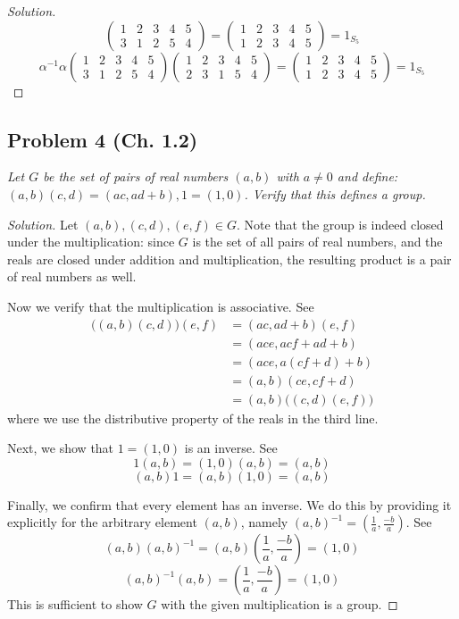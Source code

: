 \documentclass{article}
\begin{document}
\begin{proof}[Solution]
\[		\begin{pmatrix} 1 & 2 & 3 & 4 & 5 \\ 3 & 1 & 2 & 5 & 4 \end{pmatrix}
		= \begin{pmatrix} 1 & 2 & 3 & 4 & 5 \\ 1 & 2 & 3 & 4 & 5 \end{pmatrix}
		= 1_{S_5} 
	\]
	\[
		\alpha^{-1} \alpha
		\begin{pmatrix} 1 & 2 & 3 & 4 & 5 \\ 3 & 1 & 2 & 5 & 4 \end{pmatrix}
		\begin{pmatrix} 1 & 2 & 3 & 4 & 5 \\ 2 & 3 & 1 & 5 & 4 \end{pmatrix}
		= \begin{pmatrix} 1 & 2 & 3 & 4 & 5 \\ 1 & 2 & 3 & 4 & 5 \end{pmatrix}
		= 1_{S_5} 
	\]
\end{proof}

\subsection*{Problem 4 (Ch. 1.2)}
{\it Let $G$ be the set of pairs of real numbers $(a,b)$ with $a \neq 0$ and define:
$(a,b)(c,d) = (ac, ad + b), 1 = (1,0)$.
Verify that this defines a group.}

\begin{proof}[Solution]\let\qed\relax
	Let $(a,b), (c,d), (e,f) \in G$.
	Note that the group is indeed closed under the multiplication:
	since $G$ is the set of all pairs of real numbers,
	and the reals are closed under addition and multiplication,
	the resulting product is a pair of real numbers as well.

	Now we verify that the multiplication is associative.
	See
	\begin{align*}
		\big((a,b)(c,d)\big)(e,f)
		&= (ac, ad + b)(e,f)\\
		&= (ace, acf + ad + b)\\
		&= (ace, a(cf + d) + b)\\
		&= (a,b)(ce, cf + d)\\
		&= (a,b)\big((c,d)(e,f)\big)
	\end{align*}
	where we use the distributive property of the reals in the third line.
	
	Next, we show that $1 = (1,0)$ is an inverse. See
	\[
		1(a,b) = (1,0)(a,b) = (a,b)
	\]
	\[
		(a,b)1 = (a,b)(1,0) = (a,b)
	\]
	
	Finally, we confirm that every element has an inverse.
	We do this by providing it explicitly for the arbitrary element $(a,b)$,
	namely $(a,b)^{-1} = (\frac{1}{a}, \frac{-b}{a})$. See
	\[
		(a,b)(a,b)^{-1} = (a,b)\left(\frac{1}{a}, \frac{-b}{a}\right) = (1,0)
	\]
	\[
		(a,b)^{-1}(a,b) = \left(\frac{1}{a}, \frac{-b}{a}\right) = (1,0)
	\]
	This is sufficient to show $G$ with the given multiplication is a group.
\end{proof}
\end{document}
